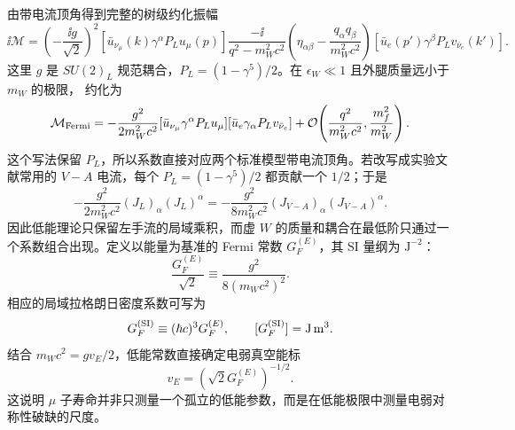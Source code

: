 由带电流顶角得到完整的树级约化振幅
\begin{equation}
 \ii\mathcal M
 =\left(-\frac{\ii g}{\sqrt2}\right)^2
 \left[\bar u_{\nu_\mu}(k)\gamma^\alpha P_Lu_\mu(p)\right]
 \frac{-\ii}{q^2-m_W^2c^2}
 \left(\eta_{\alpha\beta}-\frac{q_\alpha q_\beta}{m_W^2c^2}\right)
 \left[\bar u_e(p')\gamma^\beta P_Lv_{\bar\nu_e}(k')\right].
 \label{eq:muon-full-w-amplitude-dp11}
\end{equation}
这里 $g$ 是 $SU(2)_L$ 规范耦合，$P_L=(1-\gamma^5)/2$。在 $\epsilon_W\ll1$ 且外腿质量远小于 $m_W$ 的极限， 约化为
\begin{equation}
 \mathcal M_{\rm Fermi}
 =-\frac{g^2}{2m_W^2c^2}
 [\bar u_{\nu_\mu}\gamma^\alpha P_Lu_\mu]
 [\bar u_e\gamma_\alpha P_Lv_{\bar\nu_e}]
 +\mathcal O\!\left(\frac{q^2}{m_W^2c^2},\frac{m_f^2}{m_W^2}\right).
 \label{eq:fermi-amplitude-pl-dp11}
\end{equation}
这个写法保留 $P_L$，所以系数直接对应两个标准模型带电流顶角。若改写成实验文献常用的 $V-A$ 电流，每个 $P_L=(1-\gamma^5)/2$ 都贡献一个 $1/2$；于是
\begin{equation*}
-\frac{g^2}{2m_W^2c^2}
(J_L)_\alpha(J_L)^\alpha
=-\frac{g^2}{8m_W^2c^2}
(J_{V-A})_\alpha(J_{V-A})^\alpha.
\end{equation*}
因此低能理论只保留左手流的局域乘积，而虚 $W$ 的质量和耦合在最低阶只通过一个系数组合出现。定义以能量为基准的 Fermi 常数 $G_F^{(E)}$，其 SI 量纲为 $\mathrm{J^{-2}}$：
\begin{equation}
 \boxed{
 \frac{G_F^{(E)}}{\sqrt2}
 \equiv\frac{g^2}{8(m_Wc^2)^2}.}
 \label{eq:gf-matching-dp11}
\end{equation}
相应的局域拉格朗日密度系数可写为
\begin{equation*}
 G_F^{(\rm SI)}\equiv(\hbar c)^3G_F^{(E)},
 \qquad [G_F^{(\rm SI)}]=\mathrm{J\,m^3}.
\end{equation*}
结合 $m_Wc^2=gv_E/2$，低能常数直接确定电弱真空能标
\begin{equation}
 \boxed{v_E=\left(\sqrt2G_F^{(E)}\right)^{-1/2}.}
 \label{eq:vev-from-gf-dp11}
\end{equation}
这说明 $\mu$ 子寿命并非只测量一个孤立的低能参数，而是在低能极限中测量电弱对称性破缺的尺度。


